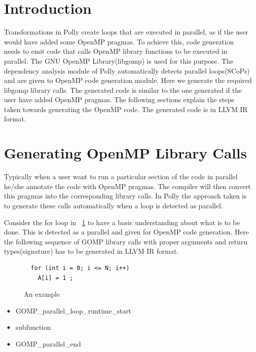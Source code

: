 \label{chap:openmp}

\section{Introduction}
Transformations in Polly create loops that are executed in parallel, as if the user would have
added some OpenMP pragmas. To achieve this, code generation needs to emit code that calls OpenMP
library functions to be executed in parallel. The GNU OpenMP Library(libgomp) is used for this purpose. The
dependency analysis module of Polly automatically detects parallel loops(SCoPs) and are given to OpenMP
code generation module. Here we generate the required libgomp library calls. The generated code is similar
to the one generated if the user have added OpenMP pragmas\cite{parfor}. The following sections explain the steps
taken towards generating the OpenMP code. The generated code is in LLVM IR format.

\section{Generating OpenMP Library Calls}

Typically when a user want to run a particular section of the code in parallel he/she annotate the code with
OpenMP pragmas. The compiler will then convert this pragmas into the corresponding library calls. In Polly the
approach taken is to generate these calls automatically when a loop is detected as parallel.

Consider the for loop in ~\ref{fig:openmp1} to have a basic understanding about what is to be done.
This is detected as a parallel and given for OpenMP code generation. Here the following
sequence of GOMP library calls with proper arguments and return types(signature) has to be generated in
LLVM IR format.

\begin{figure}
\begin{lstlisting}
  for (int i = 0; i <= N; i++)
    A[i] = 1 ;
\end{lstlisting}
	\caption{An example}
	\label{fig:openmp1}
\end{figure}

\begin{itemize}
\item GOMP\_parallel\_loop\_runtime\_start
\item subfunction
\item GOMP\_parallel\_end
\end{itemize}

